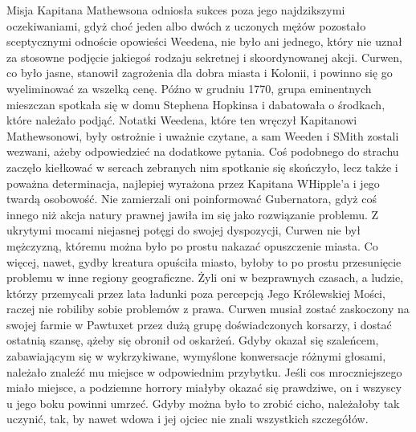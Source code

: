 Misja Kapitana Mathewsona odniosła sukces poza jego najdzikszymi oczekiwaniami, gdyż choć jeden albo dwóch z uczonych mężów pozostało sceptycznymi odnoście opowieści Weedena, nie było ani jednego, który nie uznał za stosowne podjęcie jakiegoś rodzaju sekretnej i skoordynowanej akcji. Curwen, co było jasne, stanowił zagrożenia dla dobra miasta i Kolonii, i powinno się go wyeliminować za wszelką cenę. Późno w grudniu 1770, grupa eminentnych mieszczan spotkała się w domu Stephena Hopkinsa i dabatowała o środkach, które należało podjąć. Notatki Weedena, które ten wręczył Kapitanowi Mathewsonowi, były ostrożnie i uważnie czytane, a sam Weeden i SMith zostali wezwani, ażeby odpowiedzieć na dodatkowe pytania. Coś podobnego do strachu zaczęło kiełkować w sercach zebranych nim spotkanie się skończyło, lecz także i poważna determinacja, najlepiej wyrażona przez Kapitana WHipple'a i jego twardą osobowość. Nie zamierzali oni poinformować Gubernatora, gdyż coś innego niż akcja natury prawnej jawiła im się jako rozwiązanie problemu. Z ukrytymi mocami niejasnej potęgi do swojej dyspozycji, Curwen nie był mężczyzną, któremu można było po prostu nakazać opuszczenie miasta. Co więcej, nawet, gydby kreatura opuściła miasto, byłoby to po prostu przesunięcie problemu w inne regiony geograficzne. Żyli oni w bezprawnych czasach, a ludzie, którzy przemycali przez lata ładunki poza percepcją Jego Królewskiej Mości, raczej nie robiliby sobie problemów z prawa. Curwen musiał zostać zaskoczony na swojej farmie w Pawtuxet przez dużą grupę doświadczonych korsarzy, i dostać ostatnią szansę, ążeby się obronił od oskarżeń. Gdyby okazał się szaleńcem, zabawiającym się w wykrzykiwane, wymyślone konwersacje różnymi głosami, należało znaleźć mu miejsce w odpowiednim przybytku. Jeśli cos mroczniejszego miało miejsce, a podziemne horrory miałyby okazać się prawdziwe, on i wszyscy u jego boku powinni umrzeć. Gdyby można było to zrobić cicho, należałoby tak uczynić, tak, by nawet wdowa i jej ojciec nie znali wszystkich szczegółów. 

